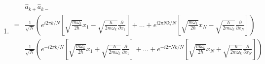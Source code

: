 \begin{enumerate}
$$    $$
    $$
    \vdots
    $$
    $$
    x_N = R - (r_2-r_N) + (r_3-r_N)+\dots + (r_{N-1}-r_N),
    $$
    then
    $$\frac{\partial}{\partial R}=\frac{\partial }{\partial x_1}
    \frac{\partial x_1}{\partial R}+
    \dots +\frac{\partial }{\partial x_N}\frac{\partial x_N}{\partial R}
    =\frac{\partial }{\partial x_1}+
    \dots +\frac{\partial }{\partial x_N}.
    $$
    Thus
    \begin{align*}
        \frac{1}{N}\frac{\partial}{\partial R}
        +\frac{1}{\sqrt{N}}
        \sum_{k=1}^{N-1}
        \sqrt{\frac{m\omega_k}{2\hbar}}
        (\hat a_{k-}- \hat a_{N-k+}) e^{i2\pi jk/N}   
        =& 
        \frac{1}{N}\frac{\partial}{\partial R}+
        \frac{1}{N}
        \sum_{k=1}^{N-1}\sum_{s=1}^N
        e^{i2\pi(j-s)k/N}
        \frac{\partial}{\partial x_s}\\
        =&\frac{1}{N}\frac{\partial}{\partial R}+
        \frac{1}{N}
        \sum_{s=1}^N\frac{\partial}{\partial x_s}(N\delta_{j,s}-1)\\
        =&\frac{\partial}{\partial x_j}
    \end{align*}
    

    \item 
    \begin{align*}
        &\hat a_{k+}\hat a_{k-}\\
        =&
        \frac{1}{\sqrt{N}}
        \left(
        e^{i2\pi k/N}
        \left[
        \sqrt{\frac{m\omega_k}{2\hbar}}x_1
        -
        \sqrt{\frac{\hbar}{2m\omega_k}}\frac{\partial}{\partial x_1}
        \right]
        +\dots 
        +
        e^{i2\pi Nk/N}
        \left[
        \sqrt{\frac{m\omega_k}{2\hbar}}x_N
        -
        \sqrt{\frac{\hbar}{2m\omega_k}}\frac{\partial}{\partial x_N}
        \right]
        \right)\\
        &\frac{1}{\sqrt{N}}
        \left(
        e^{-i2\pi k/N}
        \left[
        \sqrt{\frac{m\omega_k}{2\hbar}}x_1
        +
        \sqrt{\frac{\hbar}{2m\omega_k}}\frac{\partial}{\partial x_1}
        \right]
        +\dots 
        +
        e^{-i2\pi Nk/N}
        \left[
        \sqrt{\frac{m\omega_k}{2\hbar}}x_N
        +
        \sqrt{\frac{\hbar}{2m\omega_k}}\frac{\partial}{\partial x_N}
        \right]
        \right)
    \end{align*}


\end{enumerate}
